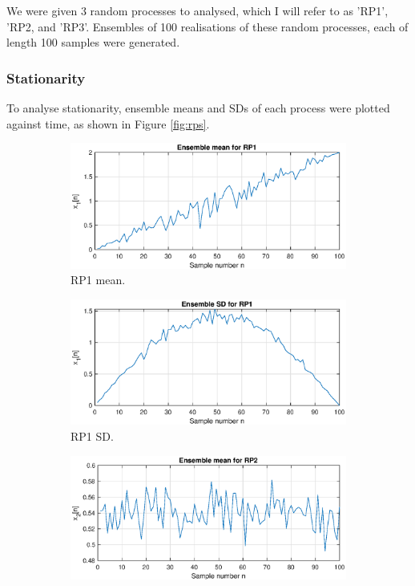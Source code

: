 \noindent
We were given 3 random processes to analysed, which I will refer to as 'RP1', 'RP2, and 'RP3'. Ensembles of 100 realisations of these random processes, each of length 100 samples were generated. 

\subsubsection{Stationarity}

To analyse stationarity, ensemble means and SDs of each process were plotted against time, as shown in Figure \ref{fig:rps}. 

\begin{figure}[H]
    \begin{center}
\begin{subfigure}{0.4\textwidth}
  \includegraphics[width=\linewidth]{assignment1figs/RP1_mean.eps}
  \caption{RP1 mean.}
  \label{fig:rp1mean}
\end{subfigure}\hfil 
\begin{subfigure}{0.4\textwidth}
  \includegraphics[width=\linewidth]{assignment1figs/RP1_SD.eps}
  \caption{RP1 SD.}
  \label{fig:rp1SD}
\end{subfigure}
\medskip
\begin{subfigure}{0.4\textwidth}
  \includegraphics[width=\linewidth]{assignment1figs/RP2_mean.eps}

\end{subfigure}
\end{center}
\end{figure}
